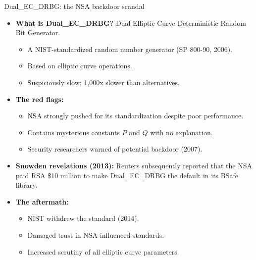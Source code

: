 \ifdefined\PRESENTATION\else\PassOptionsToClass{handout}{beamer}\fi\documentclass[aspectratio=169, lualatex]{beamer}
\begin{document}
\begin{frame}{Dual\_EC\_DRBG: the NSA backdoor scandal}
	\begin{itemize}[<+->]
		\item \textbf{What is Dual\_EC\_DRBG?} Dual Elliptic Curve Deterministic Random Bit Generator.
		      \begin{itemize}
			      \item A NIST-standardized random number generator (SP 800-90, 2006).
			      \item Based on elliptic curve operations.
			      \item Suspiciously slow: 1,000x slower than alternatives.
		      \end{itemize}
		\item \textbf{The red flags:}
		      \begin{itemize}
			      \item NSA strongly pushed for its standardization despite poor performance.
			      \item Contains mysterious constants $P$ and $Q$ with no explanation.
			      \item Security researchers warned of potential backdoor (2007).
		      \end{itemize}
		\item \textbf{Snowden revelations (2013):} Reuters subsequently reported that the NSA paid RSA \$10 million to make Dual\_EC\_DRBG the default in its BSafe library.
		\item \textbf{The aftermath:}
		      \begin{itemize}
			      \item NIST withdrew the standard (2014).
			      \item Damaged trust in NSA-influenced standards.
			      \item Increased scrutiny of all elliptic curve parameters.
		      \end{itemize}
	\end{itemize}
\end{frame}
\end{document}
